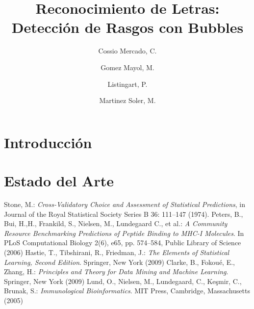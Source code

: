 \documentclass[runningheads,a4paper]{llncs}
\newcommand{\keywords}[1]{\par\addvspace\baselineskip
\noindent\keywordname\enspace\ignorespaces#1}
\begin{document}
\mainmatter

\title{Reconocimiento de Letras:\\ Detecci\'on de Rasgos con Bubbles}
\author{Cossio Mercado, C. \and Gomez Mayol, M. \and Listingart, P. \and Martinez Soler, M.}


\maketitle
\begin{abstract}

\keywords{}
\end{abstract}


\section{Introducción}
\label{sec:Introduccion}

\section{Estado del Arte}
\label{sec:EstadoDelArte}


\begin{thebibliography}{10}
   Stone, M.: \emph{Cross-Validatory Choice and Assessment of Statistical Predictions}, in  Journal of the Royal Statistical Society Series B 36: 111–147 (1974).
   Peters, B., Bui, H.,H., Frankild, S., Nielsen, M., Lundegaard C., et al.: \emph{A Community Resource Benchmarking Predictions of Peptide Binding to MHC-I Molecules}.
In PLoS Computational Biology 2(6), e65, pp. 574--584, Public Library of Science (2006)
 Hastie, T., Tibshirani, R., Friedman, J.: \emph{The Elements of Statistical Learning, Second Edition}. Springer, New York (2009)
   Clarke, B., Fokoué, E., Zhang, H.: \emph{Principles and Theory for Data Mining and Machine Learning}. Springer, New York (2009)
   Lund, O., Nielsen, M., Lundegaard, C., Ke\c smir, C., Brunak, S.: \emph{Immunological Bioinformatics}. MIT Press, Cambridge, Massachusetts (2005)
\end{thebibliography}
\end{document}
